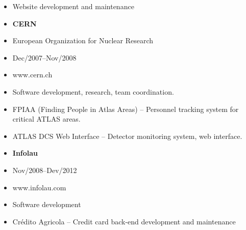 \documentclass[a4paper,english]{article}
\begin{document}
\begin{minipage}[t]{0.5\linewidth}
    \begin{itemize}
    \setlength{\itemsep}{-1mm}
        \item[] Website development and maintenance
    \end{itemize}
\end{minipage}
\vspace{0.5cm}
\begin{minipage}[t]{0.5\linewidth}
    \begin{itemize}
    \setlength{\itemsep}{-1mm}
        \item[] {\bf CERN}
        \item[] European Organization for Nuclear Research
        \item[] Dec/2007--Nov/2008
        \item[] www.cern.ch
    \end{itemize}
\end{minipage}
\begin{minipage}[t]{0.5\linewidth}
    \begin{itemize}
    \setlength{\itemsep}{-1mm}
        \item[] Software development, research, team coordination.
        \item[] FPIAA (Finding People in Atlas Areas) -- Personnel tracking system for critical ATLAS areas.
        \item[] ATLAS DCS Web Interface -- Detector monitoring system, web interface.
    \end{itemize}
\end{minipage}
\vspace{0.5cm}
\begin{minipage}[t]{0.5\linewidth}
    \begin{itemize}
    \setlength{\itemsep}{-1mm}
        \item[] {\bf Infolau}
        \item[] Nov/2008--Dev/2012
        \item[] www.infolau.com
    \end{itemize}
\end{minipage}
\begin{minipage}[t]{0.5\linewidth}
    \begin{itemize}
    \setlength{\itemsep}{-1mm}
        \item[] Software development
        \item[] Crédito Agricola -- Credit card back-end development and maintenance
    \end{itemize}
\end{minipage}
\end{document}
